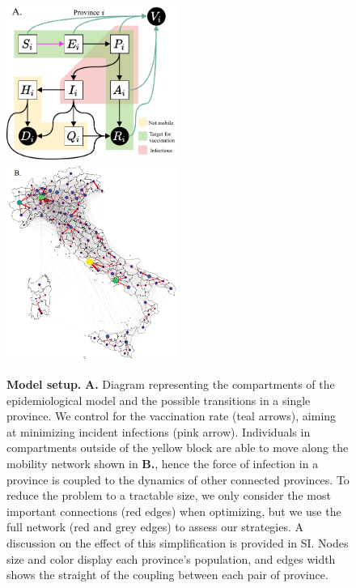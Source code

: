 \begin{figure}[!ht]
    \centering
    \includegraphics[width=0.5\textwidth]{fig_italy-ocp/figures/OCPItalydrawio2.pdf}
    \includegraphics[width=0.5\textwidth]{fig_italy-ocp/figures/map_nd.png}
    \caption[Optimal control model setup]{\textbf{Model setup.} \textbf{A.} Diagram representing the compartments of the epidemiological model and the possible transitions in a single province. We control for the vaccination rate (teal arrows), aiming at minimizing incident infections (pink arrow). Individuals in compartments outside of the yellow block are able to move along the mobility network shown in \textbf{B.}, hence the force of infection in a province is coupled to the dynamics of other connected provinces. To reduce the problem to a tractable size, we only consider the most important connections (red edges) when optimizing, but we use the full network (red and grey edges) to assess our strategies. A discussion on the effect of this simplification is provided in SI. Nodes size and color display each province's population, and edges width shows the straight of the coupling between each pair of province.
    }
    \label{fig:model_description}
\end{figure}

